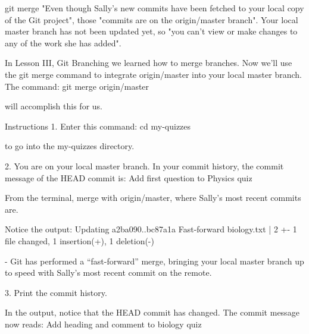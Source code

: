 git merge
    "Even though Sally’s new commits have been fetched to your local copy of the Git project", those "commits are on the origin/master branch". Your local master branch has not been updated yet, so "you can’t view or make changes to any of the work she has added".

    In Lesson III, Git Branching we learned how to merge branches. Now we’ll use the git merge command to integrate origin/master into your local master branch. The command:
        git merge origin/master
    
    will accomplish this for us.

Instructions
    1.
    Enter this command:
        cd my-quizzes
    
    to go into the my-quizzes directory.

    2.
    You are on your local master branch. In your commit history, the commit message of the HEAD commit is:
        Add first question to Physics     quiz 
    
    From the terminal, merge with origin/master, where Sally’s most recent commits are.

    Notice the output:
        Updating a2ba090..bc87a1a
        Fast-forward
        biology.txt | 2 +-
        1 file changed, 1 insertion(+), 1 deletion(-)
        
        - Git has performed a “fast-forward” merge, bringing your local master branch up to speed with Sally’s most recent commit on the remote.

    3.
    Print the commit history.

    In the output, notice that the HEAD commit has changed. The commit message now reads:
        Add heading and comment to biology quiz 